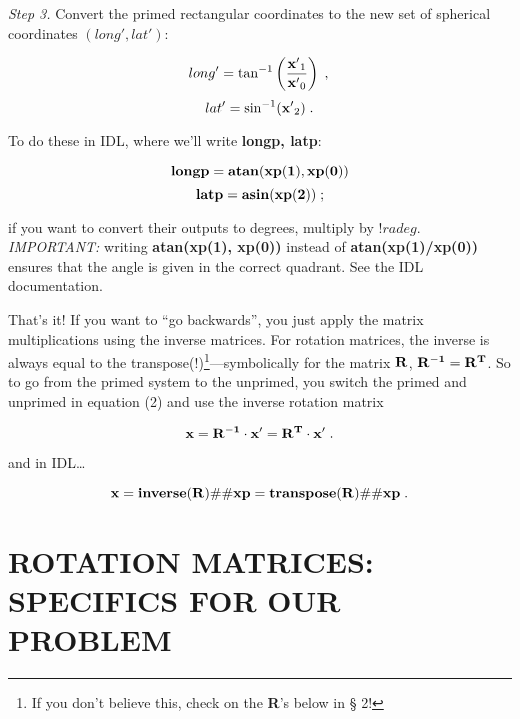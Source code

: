	{\it Step 3.} Convert the primed rectangular coordinates to the
new set of spherical coordinates $(long', lat')$:

\begin{mathletters} 
\begin{equation} 
long' = \tan^{-1} \left({{\bf x'}_1 \over {\bf x'}_0}\right) \; , \\ 
\end{equation} 
\begin{equation} 
lat' =
\sin^{-1} ({\bf x'}_2) \; .  
\end{equation} 
\end{mathletters}

\noindent To do these in IDL, where we'll write {\bf longp, latp}:

\begin{mathletters}
\begin{equation}
{\bf longp = atan(xp(1), xp(0))}
\end{equation}
\begin{equation}
{\bf latp = asin(xp(2))} \; ;
\end{equation}
\end{mathletters}

\noindent if you want to convert their outputs to degrees, multiply by
$!radeg$.  {\it IMPORTANT:} writing {\bf atan(xp(1), xp(0))} instead of
{\bf atan(xp(1)/xp(0))} ensures that the angle is given in the correct
quadrant.  See the IDL documentation. 

	That's it! If you want to ``go backwards'', you just apply the
matrix multiplications using the inverse matrices.  For rotation
matrices, the inverse is always equal to the transpose(!)\footnote{If
you don't believe this, check on the {\bf R}'s below in \S
2!}---symbolically for the matrix ${\bf R}$, ${\bf R^{-1}} = {\bf R^T}$. 
So to go from the primed system to the unprimed, you switch the primed
and unprimed in equation (2) and use the inverse rotation matrix

\begin{equation}
{\bf x} = {\bf R^{-1} \cdot x'} = {\bf R^T \cdot x'}\; .
\end{equation}

\noindent and in IDL\dots

\begin{equation} 
{\bf x} = {\bf inverse(R) } \#\# {\bf xp} = {\bf transpose(R) } 
\#\# {\bf xp} \; .  
\end{equation}

\section {ROTATION MATRICES: SPECIFICS FOR OUR PROBLEM}

